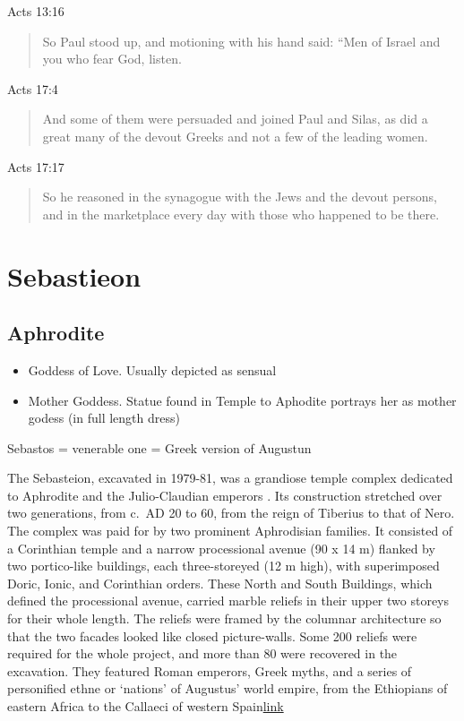 \documentclass[
]{book}
\begin{document}
Acts 13:16

\begin{quote}
So Paul stood up, and motioning with his hand said:
``Men of Israel and you who fear God, listen.
\end{quote}

Acts 17:4

\begin{quote}
And some of them were persuaded and joined Paul and Silas, as did a great many of the devout Greeks and not a few of the leading women.
\end{quote}

Acts 17:17

\begin{quote}
So he reasoned in the synagogue with the Jews and the devout persons, and in the marketplace every day with those who happened to be there.
\end{quote}

\hypertarget{sebastieon}{%
\section{Sebastieon}\label{sebastieon}}

\hypertarget{aphrodite}{%
\subsection{Aphrodite}\label{aphrodite}}

\begin{itemize}
\item
  Goddess of Love. Usually depicted as sensual
\item
  Mother Goddess. Statue found in Temple to Aphodite portrays her as mother godess (in full length dress)
\end{itemize}

Sebastos = venerable one = Greek version of Augustun

The Sebasteion, excavated in 1979-81, was a grandiose temple complex dedicated to Aphrodite and the Julio-Claudian emperors . Its construction stretched over two generations, from c.~AD 20 to 60, from the reign of Tiberius to that of Nero. The complex was paid for by two prominent Aphrodisian families. It consisted of a Corinthian temple and a narrow processional avenue (90 x 14 m) flanked by two portico-like buildings, each three-storeyed (12 m high), with superimposed Doric, Ionic, and Corinthian orders. These North and South Buildings, which defined the processional avenue, carried marble reliefs in their upper two storeys for their whole length. The reliefs were framed by the columnar architecture so that the two facades looked like closed picture-walls. Some 200 reliefs were required for the whole project, and more than 80 were recovered in the excavation. They featured Roman emperors, Greek myths, and a series of personified ethne or `nations' of Augustus' world empire, from the Ethiopians of eastern Africa to the Callaeci of western Spain\href{http://aphrodisias.classics.ox.ac.uk/sebasteion.html}{link}
\end{document}
